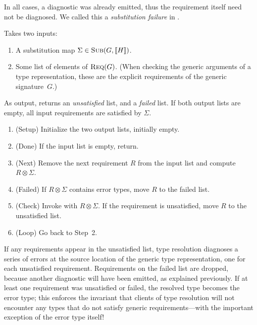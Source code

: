 \documentclass[../generics]{subfiles}
\begin{document}
In all cases, a diagnostic was already emitted, thus the requirement itself need not be diagnosed. We called this a \emph{substitution failure} in .
\begin{algorithm}\label{check generic arguments algorithm}
Takes two inputs:
\begin{enumerate}
\item A substitution map $\Sigma\in\textsc{Sub}({G, [\![H]\!]})$.
\item Some list of elements of $\textsc{Req}({G})$. (When checking the generic arguments of a type representation, these are the explicit requirements of the generic signature~$G$.)
\end{enumerate}
As output, returns an \emph{unsatisfied} list, and a \emph{failed} list. If both output lists are empty, all input requirements are satisfied by $\Sigma$.
\begin{enumerate}
\item (Setup) Initialize the two output lists, initially empty.
\item (Done) If the input list is empty, return.
\item (Next) Remove the next requirement $R$ from the input list and compute $R\otimes\Sigma$.
\item (Failed) If $R\otimes\Sigma$ contains error types, move $R$ to the failed list.
\item (Check) Invoke  with $R\otimes\Sigma$. If the requirement is unsatisfied, move $R$ to the unsatisfied list.
\item (Loop) Go back to Step~2.
\end{enumerate}
\end{algorithm}
If any requirements appear in the unsatisfied list, type resolution diagnoses a series of errors at the source location of the generic type representation, one for each unsatisfied requirement. Requirements on the failed list are dropped, because another diagnostic will have been emitted, as explained previously. If at least one requirement was unsatisfied or failed, the resolved type becomes the error type; this enforces the invariant that clients of type resolution will not encounter any types that do not satisfy generic requirements---with the important exception of the error type itself!
\end{document}
